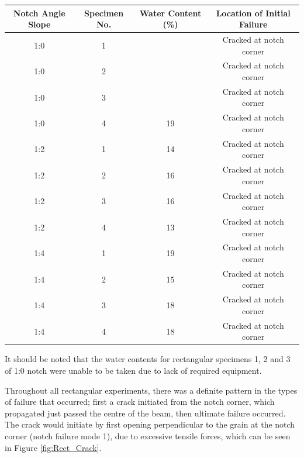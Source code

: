 \documentclass[11pt,a4paper]{article}
\numberwithin{equation}{subsection}
\begin{document}
\begin{center}
	\begin{tabular}{|c|c|c|c|} 
		\hline
		
		\textbf{Notch Angle Slope} & \textbf{Specimen No.} & \textbf{Water Content (\%)} & \textbf{Location of Initial Failure}\\ [0.5ex]
		\hline
		
		1:0 & 1 &  & Cracked at notch corner \\ [0.5ex]
		\hline
		1:0 & 2 &  & Cracked at notch corner \\ [0.5ex]
		\hline
		1:0 & 3 &  & Cracked at notch corner \\ [0.5ex]
		\hline
		1:0 & 4 & 19 & Cracked at notch corner \\ [0.5ex]
		\hline
		
		1:2 & 1 & 14 & Cracked at notch corner \\ [0.5ex]
		\hline
		1:2 & 2 & 16 & Cracked at notch corner \\ [0.5ex]
		\hline
		1:2 & 3 & 16 & Cracked at notch corner \\ [0.5ex]
		\hline
		1:2 & 4 & 13 & Cracked at notch corner \\ [0.5ex]
		\hline
		
		1:4 & 1 & 19 & Cracked at notch corner \\ [0.5ex]
		\hline
		1:4 & 2 & 15 & Cracked at notch corner \\ [0.5ex]
		\hline
		1:4 & 3 & 18 & Cracked at notch corner \\ [0.5ex]
		\hline
		1:4 & 4 & 18 & Cracked at notch corner \\ [0.5ex]
		\hline
	\end{tabular}
	\label{tab:Rect_Fail_Type}
\end{center}

\vspace*{\baselineskip}
\noindent
It should be noted that the water contents for rectangular specimens 1, 2 and 3 of 1:0 notch were unable to be taken due to lack of required equipment.

\vspace*{\baselineskip}

\noindent
Throughout all rectangular experiments, there was a definite pattern in the types of failure that occurred; first a crack initiated from the notch corner, which propagated just passed the centre of the beam, then ultimate failure occurred. The crack would initiate by first opening perpendicular to the grain at the notch corner (notch failure mode 1), due to excessive tensile forces, which can be seen in Figure \ref{fig:Rect_Crack}. 
\end{document}
